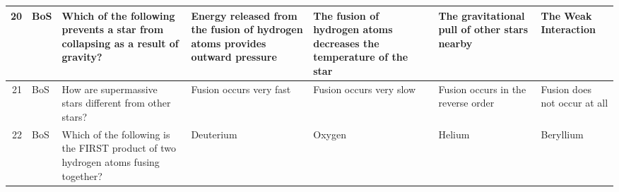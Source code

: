 \documentclass[10pt]{article}
\begin{document}
\begin{tiny}
\begin{longtable}{|r|p{0.375in}|p{1.275in}|p{0.75in}|p{0.75in}|p{0.75in}|p{0.75in}|}
    20    &     BoS &                                                                                                                                                                                                   Which of the following prevents a star from collapsing as a result of gravity? &                                                           Energy released from the fusion of hydrogen atoms provides outward pressure &                                    The fusion of hydrogen atoms decreases the temperature of the star &                                                                               The gravitational pull of other stars nearby &                                                                                                              The Weak Interaction \\\hline
    21    &     BoS &                                                                                                                                                                                                                           How are supermassive stars different from other stars? &                                                                                                               Fusion occurs very fast &                                                                               Fusion occurs very slow &                                                                                         Fusion occurs in the reverse order &                                                                                                      Fusion does not occur at all \\\hline
    22    &     BoS &                                                                                                                                                                                               Which of the following is the FIRST product of two hydrogen atoms fusing together? &                                                                                                                             Deuterium &                                                                                                Oxygen &                                                                                                                     Helium &                                                                                                                         Beryllium \\\hline

\end{longtable}
\end{tiny}
\end{document}
